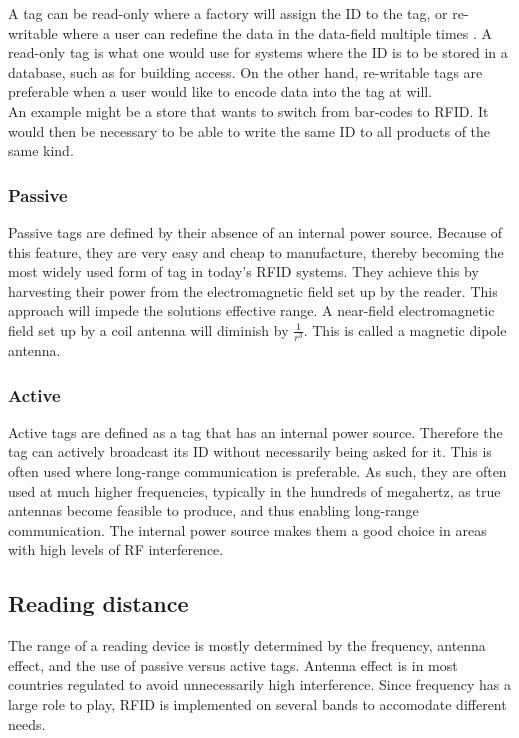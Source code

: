 A tag can be read-only where a factory will assign the ID to the tag, or re-writable where a user can redefine the data in the data-field multiple times . A read-only tag is what one would use for systems where the ID is to be stored in a database, such as for building access. On the other hand, re-writable tags are preferable when a user would like to encode data into the tag at will.\\

An example might be a store that wants to switch from bar-codes to RFID. It would then be necessary to be able to write the same ID to all products of the same kind.


\subsubsection{Passive}
Passive tags are defined by their absence of an internal power source. Because of this feature, they are very easy and cheap to manufacture, thereby becoming the most widely used form of tag in today's RFID systems. They achieve this by harvesting their power from the electromagnetic field set up by the reader. This approach will impede the solutions effective range. A near-field electromagnetic field set up by a coil antenna will diminish by $\frac{1}{r^3}$. This is called a magnetic dipole antenna. \cite{antennadesign}

\subsubsection{Active}

Active tags are defined as a tag that has an internal power source. Therefore the tag can actively broadcast its ID without necessarily being asked for it. This is often used where long-range communication is preferable. As such, they are often used at much higher frequencies, typically in the hundreds of megahertz, as true antennas become feasible to produce, and thus enabling long-range communication. The internal power source makes them a good choice in areas with high levels of RF interference. \cite{2008hacking}
\newpage
\subsection{Reading distance}

The range of a reading device is mostly determined by the frequency, antenna effect, and the use of passive versus active tags. \cite{dipankar2009rfid, weis2007rfid} Antenna effect is in most countries regulated to avoid unnecessarily high interference. Since frequency has a large role to play, RFID is implemented on several bands to accomodate different needs.

